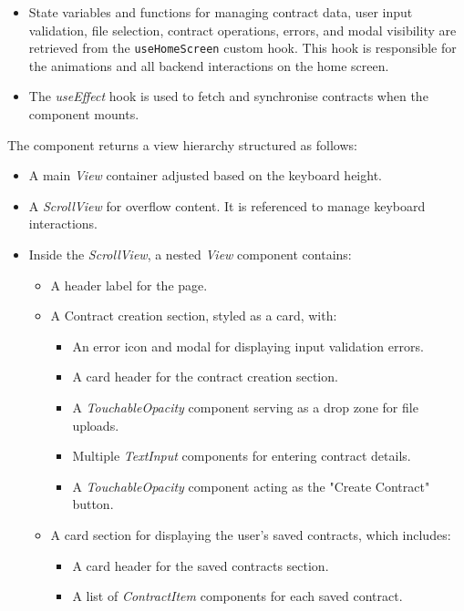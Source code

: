 \begin{itemize}
    \item State variables and functions for managing contract data, user input validation, file selection, contract operations, errors, and modal visibility are retrieved from the \texttt{useHomeScreen} custom hook. This hook is responsible for the animations and all backend interactions on the home screen.
    \item The \textit{useEffect} hook is used to fetch and synchronise contracts when the component mounts.
\end{itemize}

The component returns a view hierarchy structured as follows:

\begin{itemize}
    \item A main \textit{View} container adjusted based on the keyboard height.
    \item A \textit{ScrollView} for overflow content. It is referenced to manage keyboard interactions.
    \item Inside the \textit{ScrollView}, a nested \textit{View} component contains:
    \begin{itemize}
        \item A header label for the page.
        \item A Contract creation section, styled as a card, with:
        \begin{itemize}
            \item An error icon and modal for displaying input validation errors.
            \item A card header for the contract creation section.
            \item A \textit{TouchableOpacity} component serving as a drop zone for file uploads.
            \item Multiple \textit{TextInput} components for entering contract details.
            \item A \textit{TouchableOpacity} component acting as the "Create Contract" button.
        \end{itemize}
        \item A card section for displaying the user's saved contracts, which includes:
        \begin{itemize}
            \item A card header for the saved contracts section.
            \item A list of \textit{ContractItem} components for each saved contract.

\end{itemize}
\end{itemize}
\end{itemize}

